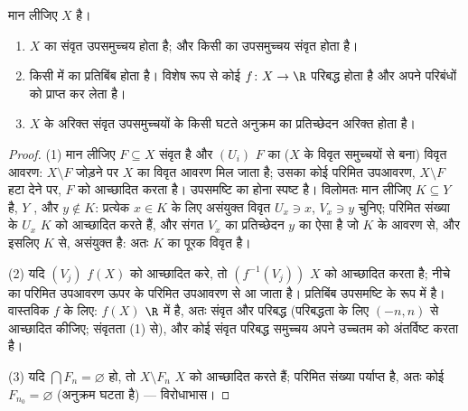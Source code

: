 \begin{theorem}[पहले गुण]\label{thm:b3:topology:compactprops}
मान लीजिए $X$  है।
\begin{enumerate}
  \item $X$ का संवृत उपसमुच्चय  होता है; और किसी  का  उपसमुच्चय संवृत होता है।
  \item किसी  में  का  प्रतिबिंब
         होता है। विशेष रूप से कोई  $f\colon X
        \to \R$ परिबद्ध होता है
        और अपने परिबंधों को प्राप्त कर लेता है।
  \item $X$ के अरिक्त संवृत उपसमुच्चयों के किसी घटते अनुक्रम का
        प्रतिच्छेदन अरिक्त होता है।
\end{enumerate}
\end{theorem}

\begin{proof}
(1) मान लीजिए $F \subseteq X$ संवृत है और $(U_i)$ $F$ का ($X$ के विवृत
समुच्चयों से बना) विवृत आवरण: $X \setminus F$ जोड़ने पर $X$ का विवृत
आवरण मिल जाता है; उसका कोई परिमित उपआवरण, $X \setminus F$ हटा देने पर,
$F$ को आच्छादित करता है। उपसमष्टि का  होना स्पष्ट है।
विलोमतः मान लीजिए $K \subseteq Y$  है, $Y$ , और $y \notin K$:
प्रत्येक $x \in K$ के लिए असंयुक्त विवृत $U_x \ni x$, $V_x \ni y$ चुनिए; परिमित
संख्या के $U_x$ $K$ को आच्छादित करते हैं, और संगत $V_x$ का
प्रतिच्छेदन $y$ का ऐसा  है जो $K$ के आवरण से, और
इसलिए $K$ से, असंयुक्त है: अतः $K$ का पूरक विवृत है।

(2) यदि $(V_j)$ $f(X)$ को आच्छादित करे, तो $(f^{-1}(V_j))$ $X$ को आच्छादित
करता है; नीचे का परिमित उपआवरण ऊपर के परिमित उपआवरण से आ जाता है।
प्रतिबिंब उपसमष्टि के रूप में  है। वास्तविक $f$ के
लिए: $f(X)$ $\R$ में  है, अतः संवृत और परिबद्ध (परिबद्धता के
लिए $(-n, n)$ से आच्छादित कीजिए; संवृतता (1) से), और कोई संवृत
परिबद्ध समुच्चय अपने उच्चतम को अंतर्विष्ट करता है।

(3) यदि $\bigcap F_n = \varnothing$ हो, तो  $X \setminus F_n$ $X$ को आच्छादित करते
हैं; परिमित संख्या पर्याप्त है, अतः कोई $F_{n_0} =
\varnothing$ (अनुक्रम घटता है)
--- विरोधाभास।
\end{proof}

